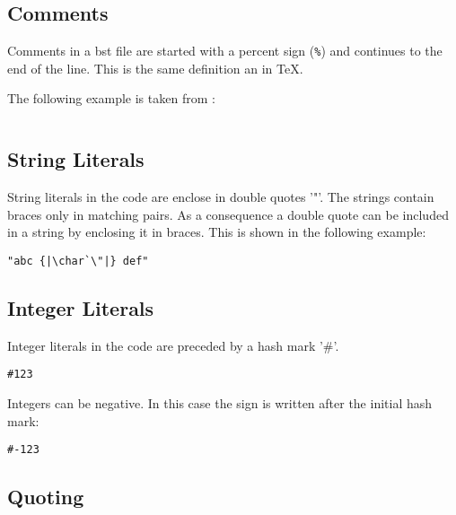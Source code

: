 \subsection{Comments}\label{sec:bst.comments}

Comments in a bst file are started with a percent sign (\verb|%|) and
continues to the end of the line. This is the same definition an in
\TeX{}.

The following example is taken from :

\begin{lstlisting}[language=bst]
  % BibTeX standard bibliography style `alpha'
\end{lstlisting}


\subsection{String Literals}\label{sec:bst.strings}

String literals in the code are enclose in double quotes '"'. The
strings contain braces only in matching pairs. As a consequence a
double quote can be included in a string by enclosing it in braces.
This is shown in the following example:

\begin{lstlisting}[language=bst,escapechar=|]
  "abc {|\char`\"|} def"
\end{lstlisting}


\subsection{Integer Literals}\label{sec:bst.integers}

Integer literals in the code are preceded by a hash mark '\#'.

\begin{lstlisting}[language=bst]
  #123
\end{lstlisting}

Integers can be negative. In this case the sign is written after the
initial hash mark:

\begin{lstlisting}[language=bst]
  #-123
\end{lstlisting}


\subsection{Quoting}\label{sec:bst.quote}

\INCOMPLETE

